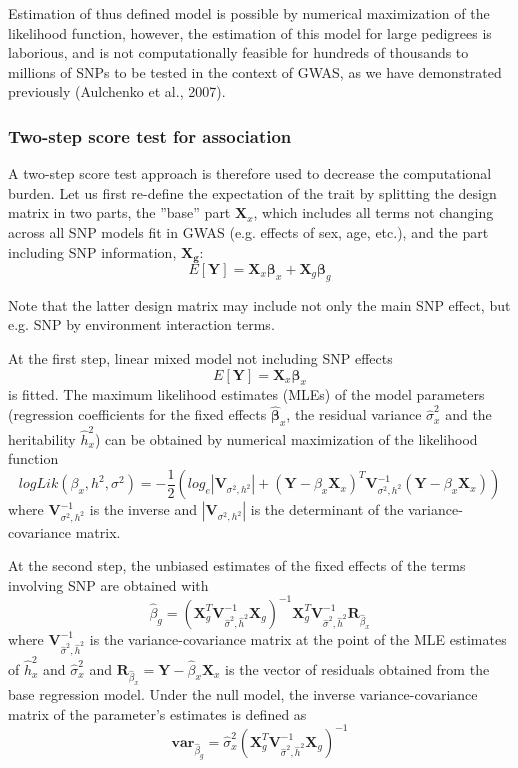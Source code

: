 \documentclass[12pt]{article}
\begin{document}
Estimation of thus defined model is possible by numerical maximization of the
likelihood function, however, the estimation of this model 
for large pedigrees is laborious, and is not computationally feasible for
hundreds of thousands to millions of SNPs to be tested in the context of GWAS,
as we have demonstrated previously (Aulchenko et al., 2007).

\subsubsection{Two-step score test for association}

A two-step score test approach is therefore used to decrease the computational
burden. Let us first re-define the expectation of the trait by splitting the 
design matrix in two parts, the ''base'' part $\mathbf{X}_x$, which includes all 
terms not changing across all SNP models fit in GWAS (e.g. effects of sex, age, etc.), 
and the part including SNP information, $\mathbf{X_g}$:
$$
E[\mathbf{Y}] = \mathbf{X}_x \mathbf{\beta}_x + \mathbf{X}_g \mathbf{\beta}_g
$$

Note that the latter design matrix may include not only the main SNP effect, but 
e.g. SNP by environment interaction terms.

At the first step, linear mixed model not including SNP effects
$$
E[\mathbf{Y}] = \mathbf{X}_x \mathbf{\beta}_x
$$
is fitted. The maximum likelihood estimates (MLEs) of the model parameters (regression coefficients for 
the fixed effects $\hat{\mathbf{\beta}}_x$, the
residual variance $\hat{\sigma}^2_x$ and the heritability $\hat{h}^2_x$) can 
be obtained by numerical maximization of the likelihood function
$$
logLik(\beta_x,h^2,\sigma^2) = -\frac{1}{2} ( log_e|\mathbf{V}_{\sigma^2,h^2}|+
(\mathbf{Y} - \beta_x \mathbf{X}_x)^T \mathbf{V}_{\sigma^2,h^2}^{-1} (\mathbf{Y} - \beta_x \mathbf{X}_x) )
$$
where $\mathbf{V}_{\sigma^2,h^2}^{-1}$ is the inverse and 
$|\mathbf{V}_{\sigma^2,h^2}|$ is the determinant of the variance-covariance matrix. 

At the second step, the unbiased estimates of the fixed effects of the terms 
involving SNP are obtained with 
$$
\hat{\beta}_g = (\mathbf{X}^T_g \mathbf{V}^{-1}_{\hat{\sigma}^2,\hat{h}^2} \mathbf{X}_g)^{-1} 
		\mathbf{X}^T_g \mathbf{V}^{-1}_{\hat{\sigma}^2,\hat{h}^2} \mathbf{R}_{\hat{\beta}_x}
$$
where $\mathbf{V}^{-1}_{\hat{\sigma}^2,\hat{h}^2}$ is the variance-covariance matrix at the point 
of the MLE estimates of $\hat{h}^2_x$ and $\hat{\sigma}^2_x$ and 
$\mathbf{R}_{\hat{\beta}_x} = \mathbf{Y} - \hat{\beta}_x \mathbf{X}_x$ is the 
vector of residuals obtained from the base regression model. Under the null 
model, the inverse variance-covariance matrix of the parameter's estimates is defined 
as
$$
\mathbf{var}_{\hat{\beta}_g} = \hat{\sigma}^2_x (\mathbf{X}^T_g \mathbf{V}^{-1}_{\hat{\sigma}^2,\hat{h}^2} \mathbf{X}_g)^{-1}
$$
\end{document}
